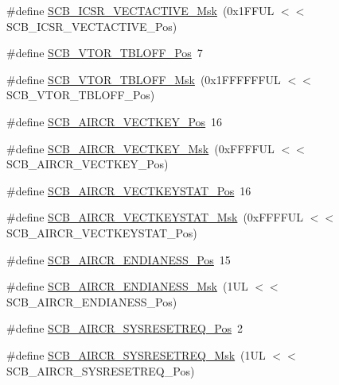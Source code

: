 \begin{DoxyCompactItemize}
\item 
\#define \hyperlink{group___c_m_s_i_s___s_c_b_ga5533791a4ecf1b9301c883047b3e8396}{S\+C\+B\+\_\+\+I\+C\+S\+R\+\_\+\+V\+E\+C\+T\+A\+C\+T\+I\+V\+E\+\_\+\+Msk}~(0x1\+F\+F\+U\+L $<$$<$ S\+C\+B\+\_\+\+I\+C\+S\+R\+\_\+\+V\+E\+C\+T\+A\+C\+T\+I\+V\+E\+\_\+\+Pos)
\item 
\#define \hyperlink{group___c_m_s_i_s___s_c_b_gac6a55451ddd38bffcff5a211d29cea78}{S\+C\+B\+\_\+\+V\+T\+O\+R\+\_\+\+T\+B\+L\+O\+F\+F\+\_\+\+Pos}~7
\item 
\#define \hyperlink{group___c_m_s_i_s___s_c_b_ga75e395ed74042923e8c93edf50f0996c}{S\+C\+B\+\_\+\+V\+T\+O\+R\+\_\+\+T\+B\+L\+O\+F\+F\+\_\+\+Msk}~(0x1\+F\+F\+F\+F\+F\+F\+U\+L $<$$<$ S\+C\+B\+\_\+\+V\+T\+O\+R\+\_\+\+T\+B\+L\+O\+F\+F\+\_\+\+Pos)
\item 
\#define \hyperlink{group___c_m_s_i_s___s_c_b_gaaa27c0ba600bf82c3da08c748845b640}{S\+C\+B\+\_\+\+A\+I\+R\+C\+R\+\_\+\+V\+E\+C\+T\+K\+E\+Y\+\_\+\+Pos}~16
\item 
\#define \hyperlink{group___c_m_s_i_s___s_c_b_ga90c7cf0c490e7ae55f9503a7fda1dd22}{S\+C\+B\+\_\+\+A\+I\+R\+C\+R\+\_\+\+V\+E\+C\+T\+K\+E\+Y\+\_\+\+Msk}~(0x\+F\+F\+F\+F\+U\+L $<$$<$ S\+C\+B\+\_\+\+A\+I\+R\+C\+R\+\_\+\+V\+E\+C\+T\+K\+E\+Y\+\_\+\+Pos)
\item 
\#define \hyperlink{group___c_m_s_i_s___s_c_b_gaec404750ff5ca07f499a3c06b62051ef}{S\+C\+B\+\_\+\+A\+I\+R\+C\+R\+\_\+\+V\+E\+C\+T\+K\+E\+Y\+S\+T\+A\+T\+\_\+\+Pos}~16
\item 
\#define \hyperlink{group___c_m_s_i_s___s_c_b_gabacedaefeefc73d666bbe59ece904493}{S\+C\+B\+\_\+\+A\+I\+R\+C\+R\+\_\+\+V\+E\+C\+T\+K\+E\+Y\+S\+T\+A\+T\+\_\+\+Msk}~(0x\+F\+F\+F\+F\+U\+L $<$$<$ S\+C\+B\+\_\+\+A\+I\+R\+C\+R\+\_\+\+V\+E\+C\+T\+K\+E\+Y\+S\+T\+A\+T\+\_\+\+Pos)
\item 
\#define \hyperlink{group___c_m_s_i_s___s_c_b_gad31dec98fbc0d33ace63cb1f1a927923}{S\+C\+B\+\_\+\+A\+I\+R\+C\+R\+\_\+\+E\+N\+D\+I\+A\+N\+E\+S\+S\+\_\+\+Pos}~15
\item 
\#define \hyperlink{group___c_m_s_i_s___s_c_b_ga2f571f93d3d4a6eac9a3040756d3d951}{S\+C\+B\+\_\+\+A\+I\+R\+C\+R\+\_\+\+E\+N\+D\+I\+A\+N\+E\+S\+S\+\_\+\+Msk}~(1\+U\+L $<$$<$ S\+C\+B\+\_\+\+A\+I\+R\+C\+R\+\_\+\+E\+N\+D\+I\+A\+N\+E\+S\+S\+\_\+\+Pos)
\item 
\#define \hyperlink{group___c_m_s_i_s___s_c_b_gaffb2737eca1eac0fc1c282a76a40953c}{S\+C\+B\+\_\+\+A\+I\+R\+C\+R\+\_\+\+S\+Y\+S\+R\+E\+S\+E\+T\+R\+E\+Q\+\_\+\+Pos}~2
\item 
\#define \hyperlink{group___c_m_s_i_s___s_c_b_gaae1181119559a5bd36e62afa373fa720}{S\+C\+B\+\_\+\+A\+I\+R\+C\+R\+\_\+\+S\+Y\+S\+R\+E\+S\+E\+T\+R\+E\+Q\+\_\+\+Msk}~(1\+U\+L $<$$<$ S\+C\+B\+\_\+\+A\+I\+R\+C\+R\+\_\+\+S\+Y\+S\+R\+E\+S\+E\+T\+R\+E\+Q\+\_\+\+Pos)

\end{DoxyCompactItemize}
